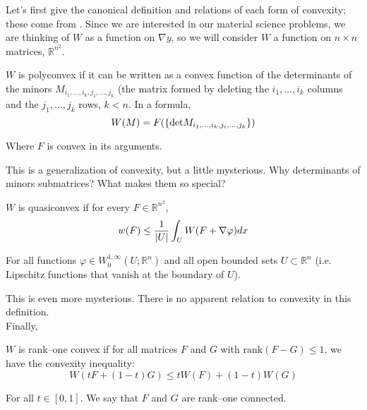 \documentclass[../main.tex]{subfiles}
\begin{document}
Let's first give the canonical definition and relations of each form of convexity; these come from \cite{dacorogna_direct_2008}.
Since we are interested in our material science problems, we are thinking of $W$ as a function on $\nabla y$, so we will consider $W$ a function on $n \times n$ matrices, $\mathbb{R}^{n^2}$.


\begin{defn}[Polyconvexity]
  $W$ is polyconvex if it can be written as a convex function of the determinants of the minors $M_{i_1, \ldots, i_k, j_1, \ldots, j_k}$ (the matrix formed by deleting the $i_1, \ldots, i_k$ columns and the $j_1, \ldots, j_k$ rows, $k < n$.
  In a formula,
  \begin{equation*}
    W(M) = F( \{\mathrm{det} M_{i_1, \ldots, i_k, j_i, \ldots, j_k}\} )
  \end{equation*}

  Where $F$ is convex in its arguments.
\end{defn}

This is a generalization of convexity, but a little mysterious.
Why determinants of minors submatrices?
What makes them so special?

\begin{defn}[Quasiconvexity]
  $W$ is quasiconvex if for every $F \in \mathbb{R}^{n^2}$,
  \begin{equation*}
    w(F) \leq \frac{1}{\lvert U\rvert} \int_U W(F + \nabla \varphi) dx
  \end{equation*}

  For all functions $\varphi \in W^{1,\infty}_0(U; \mathbb{R}^n)$ and all open bounded sets $U \subset \mathbb{R}^n$ (i.e. Lipschitz functions that vanish at the boundary of $U$).
\end{defn}

This is even more mysterious.
There is no apparent relation to convexity in this definition. \\

Finally,

\begin{defn}
  $W$ is rank--one convex if for all matrices $F$ and $G$ with $\mathrm{rank}(F-G) \leq 1$, we have the convexity inequality:
  \begin{equation*}
    W(t F + (1-t) G) \leq t W(F) + (1-t) W(G)
  \end{equation*}

  For all $t \in [0,1]$. We say that $F$ and $G$ are rank--one connected.
\end{defn}
\end{document}
